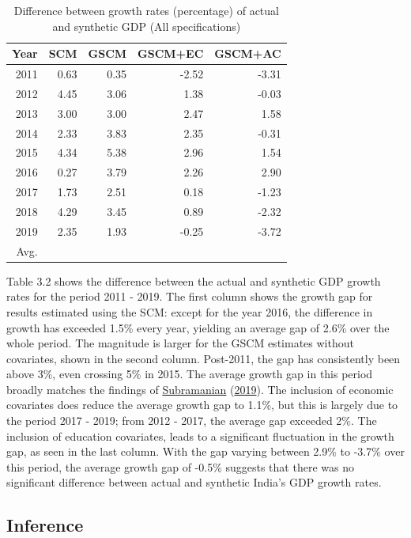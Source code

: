 \documentclass[12pt,nobind, a4paper]{reedthesis}
\begin{document}
 \newrobustcmd{\B}{\bfseries}
 \begin{table}[h!!]
 \centering
 \begin{tabular}{rrrrr}
 \hline
 Year & SCM & GSCM & GSCM+EC & GSCM+AC\\
 \hline
 2011 & 0.63 & 0.35 & -2.52 & -3.31\\
 \hline
 2012 & 4.45 & 3.06 & 1.38 & -0.03\\
 \hline
 2013 & 3.00 & 3.00 & 2.47 & 1.58\\
 \hline
 2014 & 2.33 & 3.83 & 2.35 & -0.31\\
 \hline
 2015 & 4.34 & 5.38 & 2.96 & 1.54\\
 \hline
 2016 & 0.27 & 3.79 & 2.26 & 2.90\\
 \hline
 2017 & 1.73 & 2.51 & 0.18 & -1.23\\
 \hline
 2018 & 4.29 & 3.45 & 0.89 & -2.32\\
 \hline
 2019 & 2.35 & 1.93 & -0.25 & -3.72\\
 \hline
 \B Avg. & \B 2.6 & \B 3.0 & \B 1.1& \B -0.5\\
 \hline
 \end{tabular}
 \caption{Difference between growth rates (percentage) of actual and synthetic GDP (All specifications)}
 \end{table}
 Table 3.2 shows the difference between the actual and synthetic GDP growth rates for the period 2011 - 2019. The first column shows the growth gap for results estimated using the SCM: except for the year 2016, the difference in growth has exceeded 1.5\% every year, yielding an average gap of 2.6\% over the whole period. The magnitude is larger for the GSCM estimates without covariates, shown in the second column. Post-2011, the gap has consistently been above 3\%, even crossing 5\% in 2015. The average growth gap in this period broadly matches the findings of \protect\hyperlink{ref-subramanian_indias_2019}{Subramanian} (\protect\hyperlink{ref-subramanian_indias_2019}{2019}). The inclusion of economic covariates does reduce the average growth gap to 1.1\%, but this is largely due to the period 2017 - 2019; from 2012 - 2017, the average gap exceeded 2\%. The inclusion of education covariates, leads to a significant fluctuation in the growth gap, as seen in the last column. With the gap varying between 2.9\% to -3.7\% over this period, the average growth gap of -0.5\% suggests that there was no significant difference between actual and synthetic India's GDP growth rates.

 \hypertarget{inference-1}{%
 \subsection{Inference}\label{inference-1}}
\end{document}
